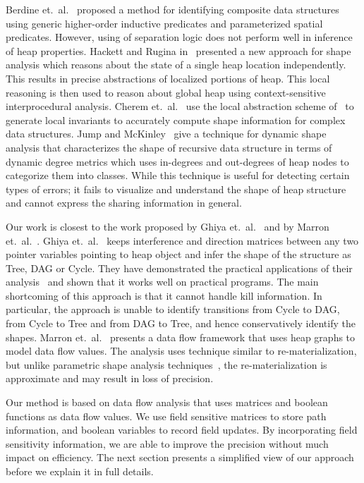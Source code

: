 \documentclass[letterpaper]{sig-alternate}
\begin{document}
Berdine et.~al.~\cite{berdine07shape} proposed a method
    for identifying composite data structures using generic
    higher-order inductive predicates and parameterized
    spatial predicates. However, using of separation logic
    does not perform well in inference of heap properties.
Hackett and Rugina in~\cite{hackett05region} presented a new
approach for shape analysis which reasons about the state of
a single heap location independently. This results in precise
abstractions of localized portions of heap. This local
reasoning is then used to reason about global heap using
context-sensitive interprocedural analysis. Cherem
et.~al.~\cite{cherem07doubly} use the local abstraction
scheme of~\cite{hackett05region} to generate local invariants
to accurately compute shape information for complex data
structures.
%
Jump and McKinley~\cite{maria09dynamic} give a technique for
dynamic shape analysis that characterizes the shape of
recursive data structure in terms of dynamic degree metrics
which uses in-degrees and out-degrees of heap nodes to
categorize them into classes. While this technique is useful
for detecting certain types of errors; it fails to visualize
and understand the shape of heap structure and cannot express
the sharing information in general.

Our work is closest to the work proposed by Ghiya
et.~al.~\cite{Ghiya96} and by Marron
et.~al.~\cite{marron06static}. Ghiya et.~al.~\cite{Ghiya96}
keeps interference and direction matrices between any two
pointer variables pointing to heap object and infer the shape
of the structure as Tree, DAG or Cycle. They have
demonstrated the practical applications of their
analysis~\cite{Ghiya98a,Ghiya98b}
and shown that it works well on practical programs. The main
shortcoming of this approach is that it cannot handle kill
information. In particular, the approach is unable to
identify transitions from Cycle to DAG, from Cycle to Tree
and from DAG to Tree, and hence conservatively identify the
shapes.
%
Marron et.~al.~\cite{marron06static} presents a data flow
framework that uses heap graphs to model data flow
values. The analysis uses technique similar to
re-materialization, but unlike parametric shape analysis
techniques~\cite{Sagiv02toplas}, the
re-materialization is approximate and may result in loss of
precision. 

Our method is based on data flow analysis that uses matrices
and boolean functions as data flow values. We use field
sensitive matrices to store path information, and boolean
variables to record field updates. By incorporating field
sensitivity information, we are able to improve the precision
without much impact on efficiency. The next section presents
a simplified view of our approach before we explain it in
full details.
\end{document}
